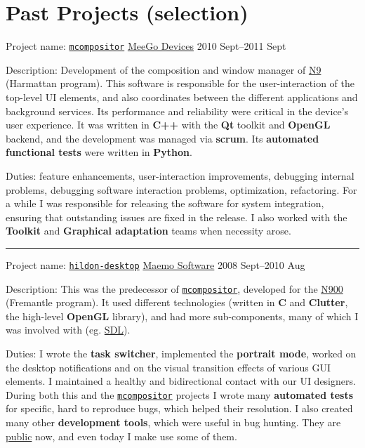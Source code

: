 \documentclass[a4paper,12pt]{article}
\newcommand\Yell{\textbf}
\newcommand\Label{\textsf}
\newcommand{\midline}{\rule[0.5ex]{\linewidth-\parindent}{.5pt}}
\begin{document}
\section{Past Projects (selection)}

\Label{Project name}: \hypertarget{mcompositor}{\href{http://meego.gitorious.org/meegotouch/meegotouch-compositor}{\texttt{mcompositor}}}\hfill
\hyperlink{MeeGo}{MeeGo Devices} \Label{2010 Sept--2011 Sept}\par\medskip
\Label{Description}: Development of the composition and window manager of
\hyperlink{gadgets}{N9} (Harmattan program).  This software is responsible
for the user-interaction of the top-level UI elements, and also coordinates
between the different applications and background services.  Its performance
and reliability were critical in the device's user experience.  It was written
in \Yell{C++} with the \Yell{Qt} toolkit and \Yell{OpenGL} backend, and the
development was managed via \Yell{scrum}.  Its \Yell{automated functional
tests} were written in \Yell{Python}.\par\medskip
\Label{Duties}: feature enhancements, user-interaction improvements,
debugging internal problems, debugging software interaction problems,
optimization, refactoring.  For a while I was responsible for releasing
the software for system integration, ensuring that outstanding issues
are fixed in the release.  I also worked with the \Yell{Toolkit} and
\Yell{Graphical adaptation} teams when necessity arose.

\midline\par
\Label{Project name}: \href{http://maemo.gitorious.org/fremantle-hildon-desktop/hildon-desktop}{\texttt{hildon-desktop}}\hfill
\hyperlink{Maemo}{Maemo Software} \Label{2008 Sept--2010 Aug}\par\medskip
\Label{Description}: This was the predecessor of \hyperlink{mcompositor}%
{\texttt{mcompositor}}, developed for the \hyperlink{gadgets}{N900}
(Fremantle program).  It used different technologies (written in \Yell{C}
and \Yell{Clutter}, the high-level \Yell{OpenGL} library), and had more
sub-components, many of which I was involved with (eg.
\href{http://www.libsdl.org}{SDL}).\par\medskip
\Label{Duties}: I wrote the \Yell{task switcher}, implemented the
\Yell{portrait mode}, worked on the desktop notifications and on
the visual transition effects of various GUI elements.  I maintained
a healthy and bidirectional contact with our UI designers.  During
both this and the \hyperlink{mcompositor}{\texttt{mcompositor}}
projects I wrote many \Yell{automated tests} for specific, hard
to reproduce bugs, which helped their resolution.  I also created
many other \Yell{development tools}, which were useful in bug hunting.
They are \href{http://github.com/enadam?tab=repositories}{public} now,
and even today I make use some of them.
\end{document}

